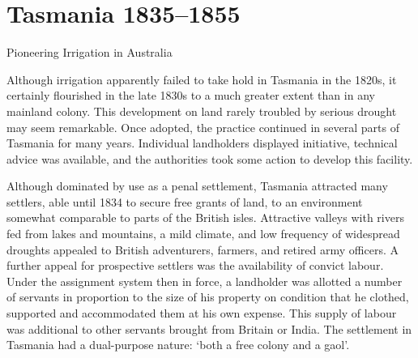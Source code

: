 
\setcounter{endnote}{0}
\chapter{Tasmania 1835--1855}
\label{ch:tas}
%
{Pioneering Irrigation in Australia}

Although irrigation apparently failed to take hold in Tasmania in the
1820s, it certainly flourished in the late 1830s to a much greater
extent than in any mainland colony.  This development on land rarely
troubled by serious drought may seem remarkable.  Once adopted, the
practice continued in several parts of Tasmania for many years.
Individual landholders displayed initiative, technical advice was
available, and the authorities took some action to develop this
facility.

Although dominated by use as a penal settlement, Tasmania attracted
many settlers, able until 1834 to secure free grants of land, to an
environment somewhat comparable to parts of the British isles.
Attractive valleys with rivers fed from lakes and mountains, a mild
climate, and low frequency of widespread droughts appealed to British
adventurers, farmers, and retired army officers.  A further appeal for
prospective settlers was the availability of convict
labour.  Under the assignment system then in
force, a landholder was allotted a number of servants in proportion to
the size of his property on condition that he clothed, supported and
accommodated them at his own expense.  This supply of labour was
additional to other servants brought from Britain or India. The
settlement in Tasmania had a dual-purpose nature: `both a free colony
and a gaol'.

